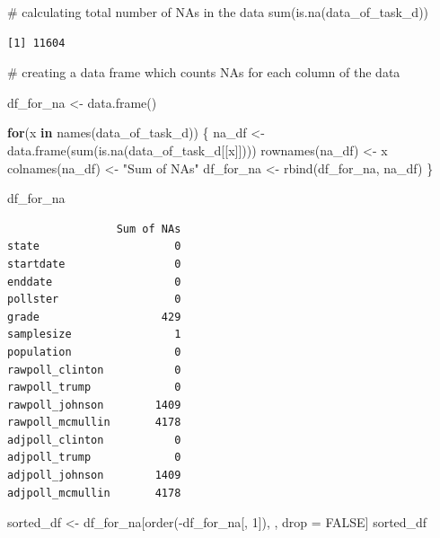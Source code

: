\documentclass[
  letterpaper,
  DIV=11,
  numbers=noendperiod]{scrartcl}
\newenvironment{Shaded}{\begin{snugshade}}{\end{snugshade}}
\newcommand{\CommentTok}[1]{\textcolor[rgb]{0.37,0.37,0.37}{#1}}
\newcommand{\ConstantTok}[1]{\textcolor[rgb]{0.56,0.35,0.01}{#1}}
\newcommand{\ControlFlowTok}[1]{\textcolor[rgb]{0.00,0.23,0.31}{\textbf{#1}}}
\newcommand{\DecValTok}[1]{\textcolor[rgb]{0.68,0.00,0.00}{#1}}
\newcommand{\FunctionTok}[1]{\textcolor[rgb]{0.28,0.35,0.67}{#1}}
\newcommand{\NormalTok}[1]{\textcolor[rgb]{0.00,0.23,0.31}{#1}}
\newcommand{\OtherTok}[1]{\textcolor[rgb]{0.00,0.23,0.31}{#1}}
\newcommand{\SpecialCharTok}[1]{\textcolor[rgb]{0.37,0.37,0.37}{#1}}
\newcommand{\StringTok}[1]{\textcolor[rgb]{0.13,0.47,0.30}{#1}}
\begin{document}
\begin{Shaded}
\begin{Highlighting}[]
\CommentTok{\# calculating total number of NAs in the data }
\FunctionTok{sum}\NormalTok{(}\FunctionTok{is.na}\NormalTok{(data\_of\_task\_d))}
\end{Highlighting}
\end{Shaded}

\begin{verbatim}
[1] 11604
\end{verbatim}

\begin{Shaded}
\begin{Highlighting}[]
\CommentTok{\# creating a data frame which counts NAs for each column of the data}

\NormalTok{df\_for\_na }\OtherTok{\textless{}{-}} \FunctionTok{data.frame}\NormalTok{()}

\ControlFlowTok{for}\NormalTok{(x }\ControlFlowTok{in} \FunctionTok{names}\NormalTok{(data\_of\_task\_d)) \{}
\NormalTok{  na\_df }\OtherTok{\textless{}{-}} \FunctionTok{data.frame}\NormalTok{(}\FunctionTok{sum}\NormalTok{(}\FunctionTok{is.na}\NormalTok{(data\_of\_task\_d[[x]])))}
  \FunctionTok{rownames}\NormalTok{(na\_df) }\OtherTok{\textless{}{-}}\NormalTok{ x}
  \FunctionTok{colnames}\NormalTok{(na\_df) }\OtherTok{\textless{}{-}} \StringTok{"Sum of NAs"}
\NormalTok{  df\_for\_na }\OtherTok{\textless{}{-}} \FunctionTok{rbind}\NormalTok{(df\_for\_na, na\_df)}
\NormalTok{\}}

\NormalTok{df\_for\_na}
\end{Highlighting}
\end{Shaded}

\begin{verbatim}
                 Sum of NAs
state                     0
startdate                 0
enddate                   0
pollster                  0
grade                   429
samplesize                1
population                0
rawpoll_clinton           0
rawpoll_trump             0
rawpoll_johnson        1409
rawpoll_mcmullin       4178
adjpoll_clinton           0
adjpoll_trump             0
adjpoll_johnson        1409
adjpoll_mcmullin       4178
\end{verbatim}

\begin{Shaded}
\begin{Highlighting}[]
\NormalTok{sorted\_df }\OtherTok{\textless{}{-}}\NormalTok{ df\_for\_na[}\FunctionTok{order}\NormalTok{(}\SpecialCharTok{{-}}\NormalTok{df\_for\_na[, }\DecValTok{1}\NormalTok{]), , drop }\OtherTok{=} \ConstantTok{FALSE}\NormalTok{]}
\NormalTok{sorted\_df}
\end{Highlighting}
\end{Shaded}
\end{document}
